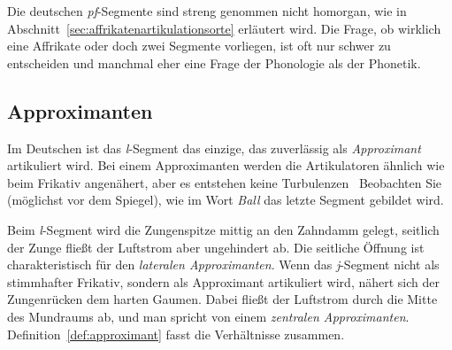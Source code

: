 
Die deutschen \textit{pf}-Segmente sind \zB streng genommen nicht homorgan, wie in Abschnitt~\ref{sec:affrikatenartikulationsorte} erläutert wird.
Die Frage, ob wirklich eine Affrikate oder doch zwei Segmente vorliegen, ist oft nur schwer zu entscheiden und manchmal eher eine Frage der Phonologie als der Phonetik.

\subsection{Approximanten}

\label{sec:lateraleapproximanten}

Im Deutschen ist das \textit{l}-Segment das einzige, das zuverlässig als \textit{Approximant} artikuliert wird.
Bei einem Approximanten werden die Artikulatoren ähnlich wie beim Frikativ angenähert, aber es entstehen keine Turbulenzen
\TuBegin~Beobachten Sie (möglichst vor dem Spiegel), wie im Wort \textit{Ball} das letzte Segment gebildet wird.

Beim \textit{l}-Segment wird die Zungenspitze mittig an den Zahndamm gelegt, seitlich der Zunge fließt der Luftstrom aber ungehindert ab.
Die seitliche Öffnung ist charakteristisch für den \textit{lateralen Approximanten}.
Wenn das \textit{j}-Segment nicht als stimmhafter Frikativ, sondern als Approximant artikuliert wird, nähert sich der Zungenrücken dem harten Gaumen.
Dabei fließt der Luftstrom durch die Mitte des Mundraums ab, und man spricht von einem \textit{zentralen Approximanten}.
Definition~\ref{def:approximant} fasst die Verhältnisse zusammen.


